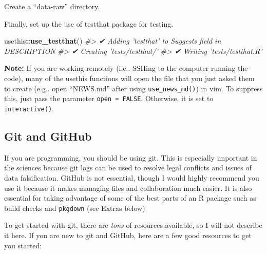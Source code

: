 \documentclass[]{book}
\newenvironment{Shaded}{\begin{snugshade}}{\end{snugshade}}
\newcommand{\CommentTok}[1]{\textcolor[rgb]{0.56,0.35,0.01}{\textit{#1}}}
\newcommand{\KeywordTok}[1]{\textcolor[rgb]{0.13,0.29,0.53}{\textbf{#1}}}
\newcommand{\NormalTok}[1]{#1}
\newcommand{\OperatorTok}[1]{\textcolor[rgb]{0.81,0.36,0.00}{\textbf{#1}}}
\begin{document}
Create a ``data-raw'' directory.

\begin{Shaded}
\end{Shaded}

Finally, set up the use of testthat package for testing.

\begin{Shaded}
\begin{Highlighting}[]
\NormalTok{usethis}\OperatorTok{::}\KeywordTok{use_testthat}\NormalTok{()}
\CommentTok{#> ✔ Adding 'testthat' to Suggests field in DESCRIPTION}
\CommentTok{#> ✔ Creating 'tests/testthat/'}
\CommentTok{#> ✔ Writing 'tests/testthat.R'}
\end{Highlighting}
\end{Shaded}

\textbf{Note:} If you are working remotely (i.e.. SSHing to the computer running the code), many of the usethis functions will open the file that you just asked them to create (e.g.. open ``NEWS.md'' after using \texttt{use\_news\_md()}) in vim. To suppress this, just pass the parameter \texttt{open\ =\ FALSE}. Otherwise, it is set to \texttt{interactive()}.

\hypertarget{git-and-github}{%
\subsection{Git and GitHub}\label{git-and-github}}

If you are programming, you should be using git. This is especially important in the sciences because git logs can be used to resolve legal conflicts and issues of data falsification. GitHub is not essential, though I would highly recommend you use it because it makes managing files and collaboration much easier. It is also essential for taking advantage of some of the best parts of an R package such as build checks and \texttt{pkgdown} (see Extras below)

To get started with git, there are \emph{tons} of resources available, so I will not describe it here. If you are new to git and GitHub, here are a few good resources to get you started:
\end{document}
